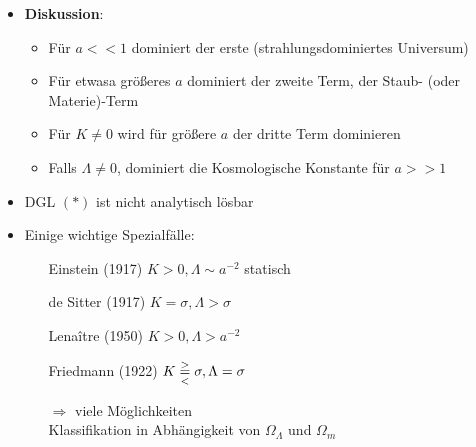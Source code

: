\begin{itemize}
\begin{equation*}
		\end{equation*}
	\item \textbf{Diskussion}:
		\begin{itemize}[label={\textbullet}]
			\item Für $a<<1$ dominiert der erste (strahlungsdominiertes Universum)
			\item Für etwasa größeres $a$ dominiert der zweite Term, der Staub- (oder Materie)-Term
			\item Für $K\neq 0$ wird für größere $a$ der dritte Term dominieren
			\item Falls $\Lambda\neq 0$, dominiert die Kosmologische Konstante für $a>>1$
		\end{itemize}
	\item DGL $(\ast)$ ist nicht analytisch lösbar
	\item Einige wichtige Spezialfälle:
		\begin{itemize}
			\item[Einstein (1917)] $K>0,\Lambda\sim a^{-2}$ statisch
			\item[de Sitter (1917)] $K=\sigma,\Lambda>\sigma$
			\item[Lena\^itre (1950)] $K>0,\Lambda>a^{-2}$
			\item[Friedmann (1922)] $K\overset{>}{\underset{<}{=}}\sigma,\Lambda =\sigma$
				\begin{figure}[H]
				\end{figure}
				\noindent$\Rightarrow$ viele Möglichkeiten\\
				Klassifikation in Abhängigkeit von $\Omega_\Lambda$ und $\Omega_m$
				\begin{figure}[H]
\end{figure}
\end{itemize}
\end{itemize}

